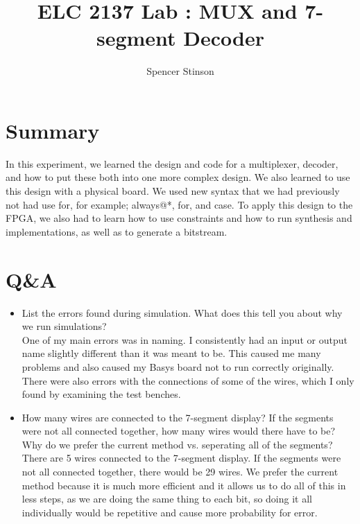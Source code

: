 \documentclass[11pt]{article}
\begin{document}
\title{ELC 2137 Lab : MUX and 7-segment Decoder}
\author{Spencer Stinson}

\maketitle


\section*{Summary}

In this experiment, we learned the design and code for a multiplexer, decoder, and how to put these both into one more complex design. We also learned to use this design with a physical board. We used new syntax that we had previously not had use for, for example; always@*, for, and case. To apply this design to the FPGA, we also had to learn how to use constraints and how to run synthesis and implementations, as well as to generate a bitstream.


\section*{Q\&A}
\begin {itemize}
\item List the errors found during simulation. What does this tell you about why we run simulations?\\
One of my main errors was in naming. I consistently had an input or output name slightly different than it was meant to be. This caused me many problems and also caused my Basys board not to run correctly originally. There were also errors with the connections of some of the wires, which I only found by examining the test benches. 
\item How many wires are connected to the 7-segment display? If the segments were not all connected together, how many wires would there have to be? Why do we prefer the current method vs. seperating all of the segments?\\
There are 5 wires connected to the 7-segment display. If the segments were not all connected together, there would be 29 wires. We prefer the current method because it is much more efficient and it allows us to do all of this in less steps, as we are doing the same thing to each bit, so doing it all individually would be repetitive and cause more probability for error. 
\end{itemize}
\end{document}
